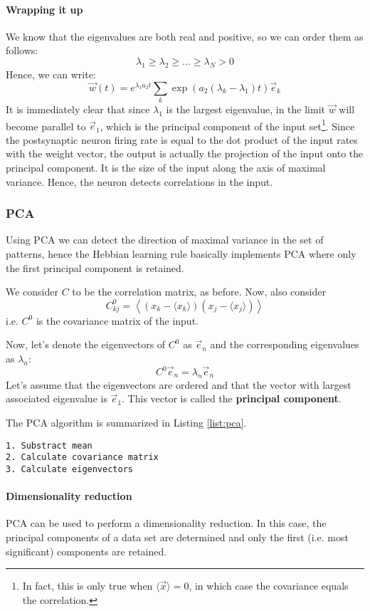 \documentclass[11pt]{article}
\begin{document}
\paragraph{Wrapping it up}
We know that the eigenvalues are both real and positive, so we can order them as follows:
\[ \lambda_1 \geq \lambda_2 \geq ... \geq \lambda_N > 0\]
Hence, we can write:
\[\vec{w}(t) = e^{\lambda_1 a_2 t} \sum_k \exp(a_2 (\lambda_k-\lambda_1) t) \vec{e}_k\]
It is immediately clear that since $\lambda_1$ is the largest eigenvalue, in the limit $\vec{w}$ will become parallel to $\vec{e}_1$, which is the principal component of the input set\footnote{In fact, this is only true when $\langle \vec{x}\rangle = 0$, in which case the covariance equals the correlation.}. 
Since the postsynaptic neuron firing rate is equal to the dot product of the input rates with the weight vector, the output is actually the projection of the input onto the principal component. It is the size of the input along the axis of maximal variance.
Hence, the neuron detects correlations in the input.


\subsubsection{PCA} Using PCA we can detect the direction of maximal variance in the set of patterns, hence the Hebbian learning rule basically implements PCA where only the first principal component is retained.

We consider $C$ to be the correlation matrix, as before. Now, also consider
\[C_{kj}^0 = \left\langle (x_k-\langle x_k \rangle)(x_j - \langle x_j \rangle)\right\rangle\]
i.e. $C^0$ is the covariance matrix of the input.

Now, let's denote the eigenvectors of $C^0$ as $\vec{e}_n$ and the corresponding eigenvalues as $\lambda_n$:
\[ C^0\vec{e}_n = \lambda_n \vec{e}_n \]
Let's assume that the eigenvectors are ordered and that the vector with largest associated eigenvalue is $\vec{e}_1$. This vector is called the \textbf{principal component}.

The PCA algorithm is summarized in Listing \ref{list:pca}.

\begin{lstlisting}[caption= PCA-algorithm, label=list:pca]
1. Substract mean
2. Calculate covariance matrix
3. Calculate eigenvectors
\end{lstlisting}

\paragraph{Dimensionality reduction} PCA can be used to perform a dimensionality reduction. In this case, the principal components of a data set are determined and only the first (i.e. most significant) components are retained.
\end{document}
